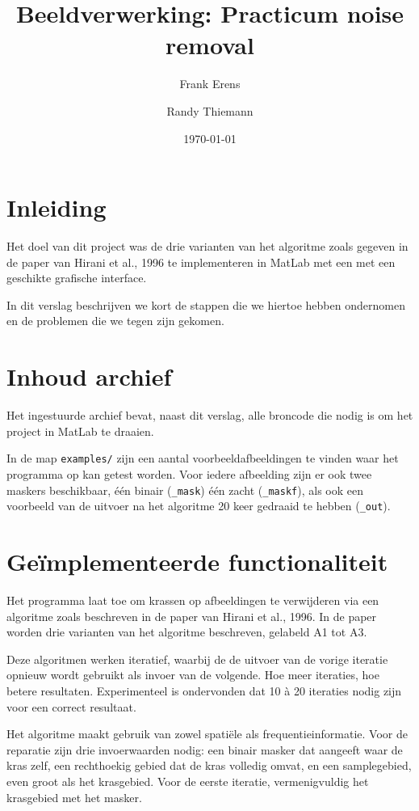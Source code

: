 \documentclass[a4paper,14pt]{extarticle}
\begin{document}
\title{Beeldverwerking: Practicum noise removal}
\author{Frank Erens \and Randy Thiemann}
\date{\isodate\today}
\maketitle

\section{Inleiding}

Het doel van dit project was de drie varianten van het algoritme zoals gegeven
in de paper van Hirani et al., 1996 te implementeren in MatLab met een
met een geschikte grafische interface.

In dit verslag beschrijven we kort de stappen die we hiertoe hebben ondernomen
en de problemen die we tegen zijn gekomen.

\section{Inhoud archief}

Het ingestuurde archief bevat, naast dit verslag, alle broncode die nodig is om
het project in MatLab te draaien. 

In de map \texttt{examples/} zijn een aantal voorbeeldafbeeldingen te vinden
waar het programma op kan getest worden. Voor iedere afbeelding zijn er ook
twee maskers beschikbaar, \'e\'en binair (\texttt{\_mask}) \'e\'en zacht 
(\texttt{\_maskf}), als ook een voorbeeld van de uitvoer na het algoritme 20
keer gedraaid te hebben (\texttt{\_out}).

\section{Ge\"implementeerde functionaliteit}

Het programma laat toe om krassen op afbeeldingen te verwijderen via een
algoritme zoals beschreven in de paper van Hirani et al., 1996. In de paper
worden drie varianten van het algoritme beschreven, gelabeld A1 tot A3. 

Deze algoritmen werken iteratief, waarbij de de uitvoer van de vorige iteratie
opnieuw wordt gebruikt als invoer van de volgende. Hoe meer iteraties, hoe
betere resultaten. Experimenteel is ondervonden dat 10 \`a 20 iteraties nodig
zijn voor een correct resultaat.

Het algoritme maakt gebruik van zowel spati\"ele als frequentieinformatie. Voor
de reparatie zijn drie invoerwaarden nodig: een binair masker dat aangeeft waar
de kras zelf, een rechthoekig gebied dat de kras volledig omvat, en een
samplegebied, even groot als het krasgebied. Voor de eerste iteratie,
vermenigvuldig het krasgebied met het masker. 
\end{document}
